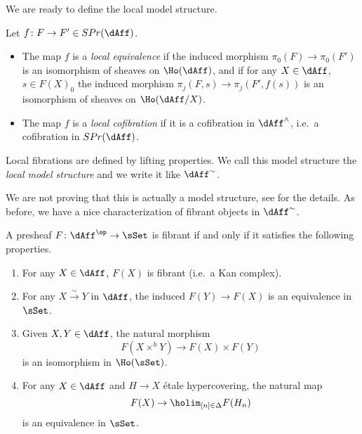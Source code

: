 \begin{description}
            We are ready to define the local model structure. 
            \begin{defn}
                \label{defn:local_model_strucure}
                Let $f\colon F \to F' \in SPr(\dAff)$. 
                \begin{itemize}
                    \item The map $f$ is a \emph{local equivalence} if the induced morphism $\pi_0(F) \to \pi_0(F')$ is an isomorphism of sheaves on $\Ho(\dAff)$, and if for any $X \in \dAff$, $s \in F(X)_0$ the induced morphism $\pi_j(F, s) \to \pi_j(F', f(s))$ is an isomorphism of sheaves on $\Ho(\dAff/X)$.
                    \item The map $f$ is a \emph{local cofibration} if it is a cofibration in $\dAff^{\wedge}$, i.e.\ a cofibration in $SPr(\dAff)$.
                \end{itemize}
                Local fibrations are defined by lifting properties. We call this model structure the \emph{local model structure} and we write it like $\dAff^{\sim}$.
            \end{defn}
            We are not proving that this is actually a model structure, see \cite{ToVe:hag1} for the details. As before, we have a nice characterization of fibrant objects in $\dAff^{\sim}$.
            \begin{prop}
                \label{prop:derived_fibrant}
                A presheaf $F\colon \dAff^{\op} \to \sSet$ is fibrant if and only if it satisfies the following properties.
                \begin{enumerate}
                    \item For any $X \in \dAff$, $F(X)$ is fibrant (i.e.\ a Kan complex).
                    \item For any $X \stackrel{\sim}{\to} Y$ in $\dAff$, the induced $F(Y) \to F(X)$ is an equivalence in $\sSet$.
                    \item Given $X, Y \in \dAff$, the natural morphism \[F(X \times^h Y) \to F(X) \times F(Y) \] is an isomorphism in $\Ho(\sSet)$.
                    \item For any $X \in \dAff$ and $H \to X$ étale hypercovering, the natural map \[F(X) \to \holim_{[n] \in \Delta} F(H_n) \] is an equivalence in $\sSet$.%
                \end{enumerate}
            \end{prop}   
            
        \end{description}
